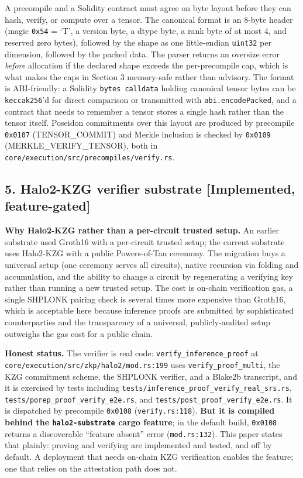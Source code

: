 A precompile and a Solidity contract must agree on byte layout before
they can hash, verify, or compute over a tensor. The canonical format is
an 8-byte header (magic \texttt{0x54} = `T', a version byte, a dtype
byte, a rank byte of at most 4, and reserved zero bytes), followed by
the shape as one little-endian \texttt{uint32} per dimension, followed
by the packed data. The parser returns an oversize error \emph{before}
allocation if the declared shape exceeds the per-precompile cap, which
is what makes the caps in Section 3 memory-safe rather than advisory.
The format is ABI-friendly: a Solidity \texttt{bytes\ calldata} holding
canonical tensor bytes can be \texttt{keccak256}'d for direct comparison
or transmitted with \texttt{abi.encodePacked}, and a contract that needs
to remember a tensor stores a single hash rather than the tensor itself.
Poseidon commitments over this layout are produced by precompile
\texttt{0x0107} (TENSOR\_COMMIT) and Merkle inclusion is checked by
\texttt{0x0109} (MERKLE\_VERIFY\_TENSOR), both in
\texttt{core/execution/src/precompiles/verify.rs}.

\subsection{5. Halo2-KZG verifier substrate {[}Implemented,
feature-gated{]}}\label{halo2-kzg-verifier-substrate-implemented-feature-gated}

\textbf{Why Halo2-KZG rather than a per-circuit trusted setup.} An
earlier substrate used Groth16 with a per-circuit trusted setup; the
current substrate uses Halo2-KZG with a public Powers-of-Tau ceremony.
The migration buys a universal setup (one ceremony serves all circuits),
native recursion via folding and accumulation, and the ability to change
a circuit by regenerating a verifying key rather than running a new
trusted setup. The cost is on-chain verification gas, a single SHPLONK
pairing check is several times more expensive than Groth16, which is
acceptable here because inference proofs are submitted by sophisticated
counterparties and the transparency of a universal, publicly-audited
setup outweighs the gas cost for a public chain.

\textbf{Honest status.} The verifier is real code:
\texttt{verify\_inference\_proof} at
\texttt{core/execution/src/zkp/halo2/mod.rs:199} uses
\texttt{verify\_proof\_multi}, the KZG commitment scheme, the SHPLONK
verifier, and a Blake2b transcript, and it is exercised by tests
including \texttt{tests/inference\_proof\_verify\_real\_srs.rs},
\texttt{tests/porep\_proof\_verify\_e2e.rs}, and
\texttt{tests/post\_proof\_verify\_e2e.rs}. It is dispatched by
precompile \texttt{0x0108} (\texttt{verify.rs:118}). \textbf{But it is
compiled behind the \texttt{halo2-substrate} cargo feature}; in the
default build, \texttt{0x0108} returns a discoverable ``feature absent''
error (\texttt{mod.rs:132}). This paper states that plainly: proving and
verifying are implemented and tested, and off by default. A deployment
that needs on-chain KZG verification enables the feature; one that
relies on the attestation path does not.

